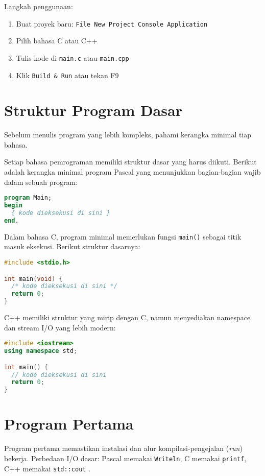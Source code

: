 \documentclass[../main.tex]{subfiles}
\begin{document}
Langkah penggunaan:
\begin{enumerate}
  \item Buat proyek baru: \texttt{File \textrightarrow{} New \textrightarrow{} Project \textrightarrow{} Console Application}
  \item Pilih bahasa C atau C++
  \item Tulis kode di \texttt{main.c} atau \texttt{main.cpp}
  \item Klik \texttt{Build \& Run} atau tekan F9
\end{enumerate}

\section{Struktur Program Dasar}
Sebelum menulis program yang lebih kompleks, pahami kerangka minimal tiap bahasa.

Setiap bahasa pemrograman memiliki struktur dasar yang harus diikuti. Berikut adalah kerangka minimal program Pascal yang menunjukkan bagian-bagian wajib dalam sebuah program:

\begin{lstlisting}[language=Pascal, caption={Kerangka program Pascal}]
program Main;
begin
  { kode dieksekusi di sini }
end.
\end{lstlisting}

Dalam bahasa C, program minimal memerlukan fungsi \texttt{main()} sebagai titik masuk eksekusi. Berikut struktur dasarnya:

\begin{lstlisting}[language=C, caption={Kerangka program C}]
#include <stdio.h>

int main(void) {
  /* kode dieksekusi di sini */
  return 0;
}
\end{lstlisting}

C++ memiliki struktur yang mirip dengan C, namun menyediakan namespace dan stream I/O yang lebih modern:

\begin{lstlisting}[language=C++, caption={Kerangka program C++}]
#include <iostream>
using namespace std;

int main() {
  // kode dieksekusi di sini
  return 0;
}
\end{lstlisting}

\section{Program Pertama}
Program pertama memastikan instalasi dan alur kompilasi-pengejalan (\emph{run}) bekerja. Perbedaan I/O dasar: Pascal memakai \texttt{Writeln}, C memakai \texttt{printf}, C++ memakai \texttt{std::cout} \parencite{w3pascal-io,gnu-c-manual,cpp-reference}.
\end{document}
